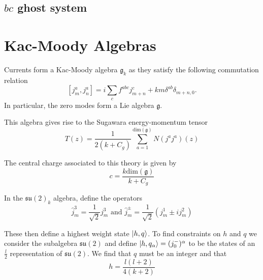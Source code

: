 \documentclass{article}
\begin{document}
\subsection{$bc$ ghost system}

\section{Kac-Moody Algebras}

Currents form a Kac-Moody algebra $\mathfrak{g}_k$ as they satisfy the following commutation relation $$[j_m^a,j_n^a]=i \sum_cf^{abc}j_{m+n}^c+km\delta^{ab}\delta_{m+n,0}.$$ In particular, the zero modes form a Lie algebra $\mathfrak{g}$. 

This algebra gives rise to the Sugawara energy-momentum tensor $$T(z)=\frac{1}{2(k+C_g)}\sum_{a=1}^{\text{dim}(\mathfrak{g})}N(j^aj^a)(z)$$

The central charge associated to this theory is given by $$c=\frac{k \text{dim}(\mathfrak{g})}{k+C_g}$$

In the $\mathfrak{su}(2)_k$ algebra, define the operators $$\hat{j}^3_m=\frac{1}{\sqrt{2}}j_m^3 \text{ and } \hat{j}^{\pm}_m=\frac{1}{\sqrt{2}}(j^1_m\pm ij^2_m)$$

These then define a highest weight state $\ket{h,q}$. To find constraints on $h$ and $q$ we consider the subalgebra $\mathfrak{su}(2)$ and define $\ket{h,q_{\alpha}}=(j_0^-)^{\alpha}$ to be the states of an $\frac{l}{2}$ representation of $\mathfrak{su}(2)$. We find that $q$ must be an integer and that $$h=\frac{l(l+2)}{4(k+2)}$$
\end{document}
